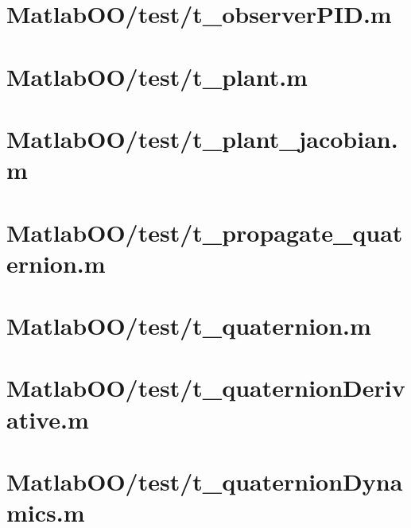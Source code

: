 \pagebreak
\section{MatlabOO/test/t\_observerPID.m}\label{code:MatlabOO/test/t_observerPID.m}


\pagebreak
\section{MatlabOO/test/t\_plant.m}\label{code:MatlabOO/test/t_plant.m}


\pagebreak
\section{MatlabOO/test/t\_plant\_jacobian.m}\label{code:MatlabOO/test/t_plant_jacobian.m}


\pagebreak
\section{MatlabOO/test/t\_propagate\_quaternion.m}\label{code:MatlabOO/test/t_propagate_quaternion.m}


\pagebreak
\section{MatlabOO/test/t\_quaternion.m}\label{code:MatlabOO/test/t_quaternion.m}


\pagebreak
\section{MatlabOO/test/t\_quaternionDerivative.m}\label{code:MatlabOO/test/t_quaternionDerivative.m}


\pagebreak
\section{MatlabOO/test/t\_quaternionDynamics.m}\label{code:MatlabOO/test/t_quaternionDynamics.m}


